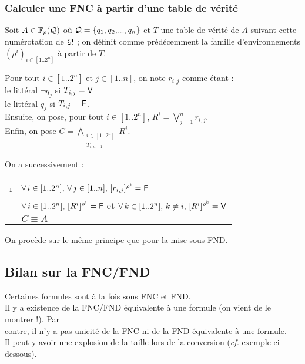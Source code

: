 		\subsubsection{Calculer une FNC à partir d'une table de vérité}
	
			Soit \(A \in \FpQ\) où \(\cal{Q} = \{q_1,q_2, \! ... ,q_n\}\) et \(T\) une table de vérité de \(A\) suivant cette numérotation de \(\cal{Q}\) ; on définit comme prédécemment la famille d'environnements \((\rho^i)_{i \in [1..2^n]}\) à partir de \(T\).
			
			\begin{Notations}
				Pour tout \(i \in [1..2^n]\) et \(j \in [1..n]\), on note \(r_{i,j}\) comme étant : \\
				\hspace*{4mm} \bdot le littéral \(\neg q_j\) si \(T_{i,j} = \V\) \\
				\hspace*{4mm} \bdot le littéral \(q_j\) si \(T_{i,j} = \F\). \\
			Ensuite, on pose, pour tout \(i \in [1..2^n]\), \(\displaystyle R^i = \bigvee_{j=1}^n r_{i,j}\). \\
			Enfin, on pose \(\displaystyle C = \bigwedge_{\substack{i \in [1..2^n] \\ T_{i,n+1}}} R^i\).
			\end{Notations}
			
			\begin{Proprietes}
				On a successivement : \!\begin{tabular}[t]{cl}
					\i & \(\forall \, i \in [1..2^n], \, \forall \, j \in [1..n], \, \itp{r_{i,j}}{\rho^i} = \F\) \\
					\ii & \(\forall \, i \in [1..2^n], \, \itp{R^i}{\rho^i} = \F\) et \(\forall \, k \in [1..2^n], \, k \neq i, \, \itp{R^i}{\rho^k} = \V\) \\
					\iii & \(C \equiv A\)
				\end{tabular}
			\end{Proprietes}
			
			\begin{Preuve}
				On procède sur le même principe que pour la mise sous FND.
			\end{Preuve}
			
	\subsection{ Bilan sur la FNC/FND}
		
		\begin{Aretenir}
		\bdot Certaines formules sont à la fois sous FNC et FND. \\
		\bdot Il y a existence de la FNC/FND équivalente à une formule (on vient de le montrer !). Par \\ \listspace contre, il n'y a pas unicité de la FNC ni de la FND équivalente à une formule. \\
		\bdot Il peut y avoir une explosion de la taille lors de la conversion (\emph{cf.} exemple ci-dessous).
		\end{Aretenir}
		
